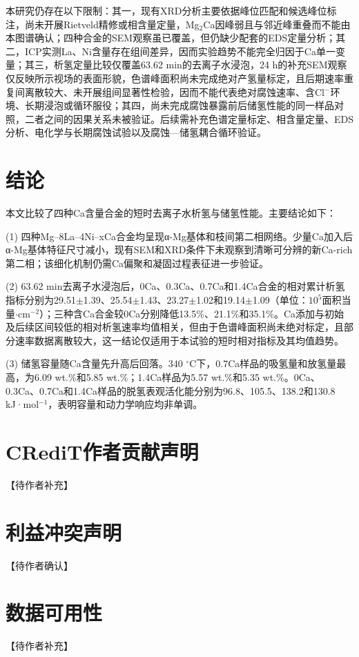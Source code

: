 \documentclass[preprint,12pt]{elsarticle}
\begin{document}
本研究仍存在以下限制：其一，现有XRD分析主要依据峰位匹配和候选峰位标注，尚未开展Rietveld精修或相含量定量，Mg$_2$Ca因峰弱且与邻近峰重叠而不能由本图谱确认；四种合金的SEM观察虽已覆盖，但仍缺少配套的EDS定量分析；其二，ICP实测La、Ni含量存在组间差异，因而实验趋势不能完全归因于Ca单一变量；其三，析氢定量比较仅覆盖63.62 min的去离子水浸泡，24 h的补充SEM观察仅反映所示视场的表面形貌，色谱峰面积尚未完成绝对产氢量标定，且后期速率重复间离散较大、未开展组间显著性检验，因而不能代表绝对腐蚀速率、含Cl$^-$环境、长期浸泡或循环服役；其四，尚未完成腐蚀暴露前后储氢性能的同一样品对照，二者之间的因果关系未被验证。后续需补充色谱定量标定、相含量定量、EDS分析、电化学与长期腐蚀试验以及腐蚀—储氢耦合循环验证。

\section{结论}

本文比较了四种Ca含量合金的短时去离子水析氢与储氢性能。主要结论如下：

\noindent (1) 四种Mg--8La--4Ni--xCa合金均呈现α-Mg基体和枝间第二相网络。少量Ca加入后α-Mg基体特征尺寸减小，现有SEM和XRD条件下未观察到清晰可分辨的新Ca-rich第二相；该细化机制仍需Ca偏聚和凝固过程表征进一步验证。

\noindent (2) 63.62 min去离子水浸泡后，0Ca、0.3Ca、0.7Ca和1.4Ca合金的相对累计析氢指标分别为29.51$\pm$1.39、25.54$\pm$1.43、23.27$\pm$1.02和19.14$\pm$1.09（单位：$10^{5}$面积当量$\cdot\mathrm{cm}^{-2}$）；三种含Ca合金较0Ca分别降低13.5\%、21.1\%和35.1\%。Ca添加与初始及后续区间较低的相对析氢速率均值相关，但由于色谱峰面积尚未绝对标定，且部分速率数据离散较大，这一结论仅适用于本试验的短时相对指标及其均值趋势。

\noindent (3) 储氢容量随Ca含量先升高后回落。340 $^\circ$C下，0.7Ca样品的吸氢量和放氢量最高，为6.09 wt.\%和5.85 wt.\%；1.4Ca样品为5.57 wt.\%和5.35 wt.\%。0Ca、0.3Ca、0.7Ca和1.4Ca样品的脱氢表观活化能分别为96.8、105.5、138.2和130.8 kJ·mol$^{-1}$，表明容量和动力学响应均非单调。

\section*{CRediT作者贡献声明}
【待作者补充】

\section*{利益冲突声明}
【待作者确认】

\section*{数据可用性}
【待作者补充】
\end{document}
